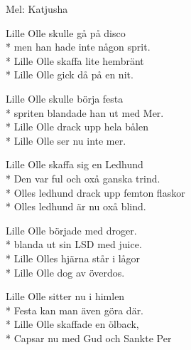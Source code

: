 \begin{SongText}
    \begin{SongInfo}
        Mel: Katjusha\
    \end{SongInfo}
    \begin{SongVerse}
        Lille Olle skulle gå på disco\\*%
        men han hade inte någon sprit.\\*%
        Lille Olle skaffa lite hembränt\\*%
        Lille Olle gick då på en nit.
    \end{SongVerse}
    \begin{SongVerse}
        Lille Olle skulle börja festa\\*%
        spriten blandade han ut med Mer.\\*%
        Lille Olle drack upp hela bålen\\*%
        Lille Olle ser nu inte mer.
    \end{SongVerse}
    \begin{SongVerse}
        Lille Olle skaffa sig en Ledhund\\*%
        Den var ful och oxå ganska trind.\\*%
        Olles ledhund drack upp femton flaskor\\*%
        Olles ledhund är nu oxå blind.
    \end{SongVerse}
    \begin{SongVerse}
        Lille Olle började med droger.\\*%
        blanda ut sin LSD med juice.\\*%
        Lille Olles hjärna står i lågor\\*%
        Lille Olle dog av överdos.
    \end{SongVerse}
    \begin{SongVerse}
        Lille Olle sitter nu i himlen\\*%
        Festa kan man även göra där.\\*%
        Lille Olle skaffade en ölback,\\*%
        Capsar nu med Gud och Sankte Per
    \end{SongVerse}
\end{SongText}